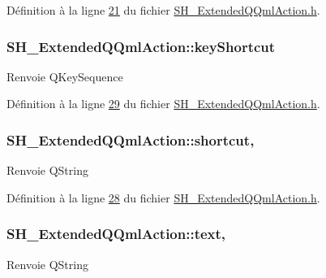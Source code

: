Définition à la ligne \hyperlink{SH__ExtendedQQmlAction_8h_source_l00021}{21} du fichier \hyperlink{SH__ExtendedQQmlAction_8h_source}{S\-H\-\_\-\-Extended\-Q\-Qml\-Action.\-h}.

\hypertarget{classSH__ExtendedQQmlAction_ab7f341734bee947d1550d74bf560b413}{
\subsubsection[{key\-Shortcut}]{\setlength{\rightskip}{0pt plus 5cm}S\-H\-\_\-\-Extended\-Q\-Qml\-Action\-::key\-Shortcut\hspace{0.3cm}{\ttfamily [write]}}}\label{classSH__ExtendedQQmlAction_ab7f341734bee947d1550d74bf560b413}
\begin{DoxyReturn}{Renvoie}
Q\-Key\-Sequence 
\end{DoxyReturn}


Définition à la ligne \hyperlink{SH__ExtendedQQmlAction_8h_source_l00029}{29} du fichier \hyperlink{SH__ExtendedQQmlAction_8h_source}{S\-H\-\_\-\-Extended\-Q\-Qml\-Action.\-h}.

\hypertarget{classSH__ExtendedQQmlAction_a9a0a096f07b5e5a5b3387699daf0358d}{
\subsubsection[{shortcut}]{\setlength{\rightskip}{0pt plus 5cm}S\-H\-\_\-\-Extended\-Q\-Qml\-Action\-::shortcut\hspace{0.3cm}{\ttfamily [read]}, {\ttfamily [write]}}}\label{classSH__ExtendedQQmlAction_a9a0a096f07b5e5a5b3387699daf0358d}
\begin{DoxyReturn}{Renvoie}
Q\-String 
\end{DoxyReturn}


Définition à la ligne \hyperlink{SH__ExtendedQQmlAction_8h_source_l00028}{28} du fichier \hyperlink{SH__ExtendedQQmlAction_8h_source}{S\-H\-\_\-\-Extended\-Q\-Qml\-Action.\-h}.

\hypertarget{classSH__ExtendedQQmlAction_a7c10b09152a7e72f82e3a8c6251b6284}{
\subsubsection[{text}]{\setlength{\rightskip}{0pt plus 5cm}S\-H\-\_\-\-Extended\-Q\-Qml\-Action\-::text\hspace{0.3cm}{\ttfamily [read]}, {\ttfamily [write]}}}\label{classSH__ExtendedQQmlAction_a7c10b09152a7e72f82e3a8c6251b6284}
\begin{DoxyReturn}{Renvoie}
Q\-String 
\end{DoxyReturn}



